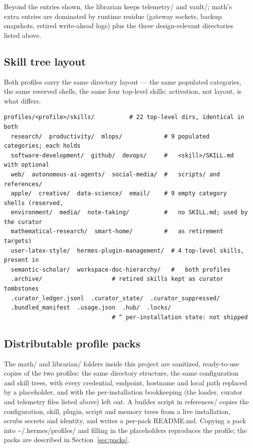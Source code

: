 \documentclass[10pt]{article}
\newcommand{\mono}[1]{{\ttfamily\small #1}}
\begin{document}
Beyond the entries shown, the librarian keeps \mono{telemetry/} and \mono{vault/}; math's extra
entries are dominated by runtime residue (gateway sockets, backup snapshots, retired write-ahead
logs) plus the three design-relevant directories listed above.

\subsection*{Skill tree layout}

Both profiles carry the same directory layout --- the same populated categories, the same reserved
shells, the same four top-level skills; activation, not layout, is what differs.

\begin{lstlisting}[label=lst:skilltree]
profiles/<profile>/skills/          # 22 top-level dirs, identical in both
  research/  productivity/  mlops/            # 9 populated categories; each holds
  software-development/  github/  devops/     #   <skill>/SKILL.md with optional
  web/  autonomous-ai-agents/  social-media/  #   scripts/ and references/
  apple/  creative/  data-science/  email/    # 9 empty category shells (reserved,
  environment/  media/  note-taking/          #   no SKILL.md; used by the curator
  mathematical-research/  smart-home/         #   as retirement targets)
  user-latex-style/  hermes-plugin-management/  # 4 top-level skills, present in
  semantic-scholar/  workspace-doc-hierarchy/   #   both profiles
  .archive/                    # retired skills kept as curator tombstones
  .curator_ledger.jsonl  .curator_state/  .curator_suppressed/
  .bundled_manifest  .usage.json  .hub/  .locks/
                               # ^ per-installation state: not shipped
\end{lstlisting}

\subsection*{Distributable profile packs}\label{sec:packs}

The \mono{math/} and \mono{librarian/} folders inside this project are sanitized, ready-to-use
copies of the two profiles: the same directory structure, the same configuration and skill trees,
with every credential, endpoint, hostname and local path replaced by a placeholder, and with the
per-installation bookkeeping (the loader, curator and telemetry files listed above) left out. A builder script
in \mono{references/} copies the configuration, skill, plugin, script and memory trees from a live
installation, scrubs secrets and identity, and writes a per-pack \mono{README.md}. Copying a pack into \mono{\textasciitilde/.hermes/profiles/} and
filling in the placeholders reproduces the profile; the packs are described in
Section~\ref{sec:packs}.
\end{document}
